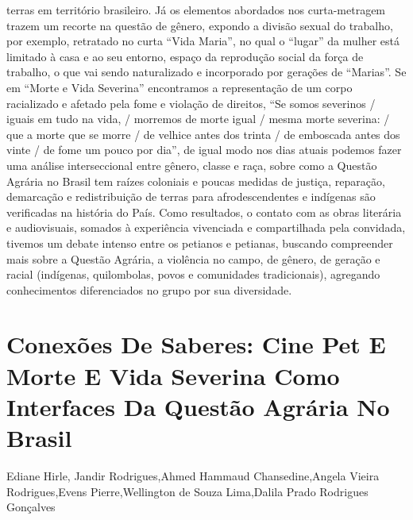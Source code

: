 terras em território brasileiro. Já os elementos abordados nos curta-metragem trazem um recorte 
na questão de gênero, expondo a divisão sexual do trabalho, por exemplo, retratado no curta “Vida 
Maria”, no qual o “lugar” da mulher está limitado à casa e ao seu entorno, espaço da reprodução 
social da força de trabalho, o que vai sendo naturalizado e incorporado por gerações de “Marias”.
Se em “Morte e Vida Severina” encontramos a representação de um corpo racializado e 
afetado pela fome e violação de direitos, “Se somos severinos / iguais em tudo na vida, / morremos 
de morte igual / mesma morte severina: / que a morte que se morre / de velhice antes dos trinta / 
de emboscada antes dos vinte / de fome um pouco por dia”, de igual modo nos dias atuais podemos 
fazer uma análise interseccional entre gênero, classe e raça, sobre como a Questão Agrária no 
Brasil tem raízes coloniais e poucas medidas de justiça, reparação, demarcação e redistribuição de 
terras para afrodescendentes e indígenas são verificadas na história do País.
Como resultados, o contato com as obras literária e audiovisuais, somados à experiência 
vivenciada e compartilhada pela convidada, tivemos um debate intenso entre os petianos e 
petianas, buscando compreender mais sobre a Questão Agrária, a violência no campo, de gênero, 
de geração e racial (indígenas, quilombolas, povos e comunidades tradicionais), agregando 
conhecimentos diferenciados no grupo por sua diversidade. 




\section*{Conexões De Saberes: Cine Pet E Morte E Vida Severina Como Interfaces Da Questão Agrária No Brasil}

Ediane Hirle, Jandir Rodrigues,Ahmed Hammaud Chansedine,Angela Vieira Rodrigues,Evens Pierre,Wellington de Souza Lima,Dalila Prado Rodrigues Gonçalves

